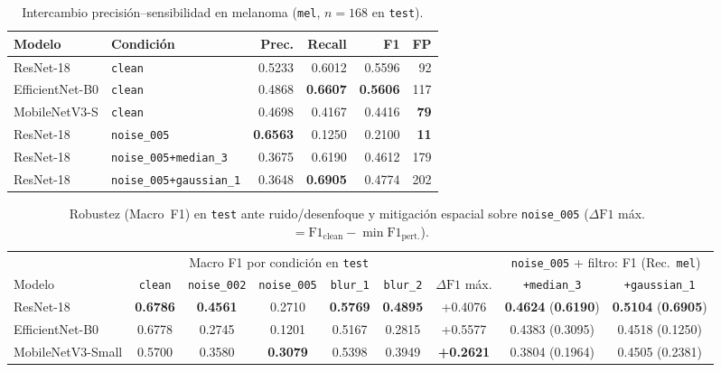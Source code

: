 \documentclass[conference]{IEEEtran}
\begin{document}
\begin{table}[t]
\centering\scriptsize
\setlength{\tabcolsep}{3.4pt}
\caption{Intercambio precisi\'on--sensibilidad en melanoma (\texttt{mel}, $n=168$ en \texttt{test}).}
\label{tab:mel_tradeoff}
\begin{tabular}{llrrrr}\toprule
Modelo & Condici\'on & Prec. & Recall & F1 & FP \\ \midrule
ResNet-18 & \texttt{clean} & 0.5233 & 0.6012 & 0.5596 & 92 \\
EfficientNet-B0 & \texttt{clean} & 0.4868 & \textbf{0.6607} & \textbf{0.5606} & 117 \\
MobileNetV3-S & \texttt{clean} & 0.4698 & 0.4167 & 0.4416 & \textbf{79} \\ \midrule
ResNet-18 & \texttt{noise\_005} & \textbf{0.6563} & 0.1250 & 0.2100 & \textbf{11} \\
ResNet-18 & \texttt{noise\_005+median\_3} & 0.3675 & 0.6190 & 0.4612 & 179 \\
ResNet-18 & \texttt{noise\_005+gaussian\_1} & 0.3648 & \textbf{0.6905} & 0.4774 & 202 \\
\bottomrule\end{tabular}
\end{table}

\begin{table}[t]
\centering\scriptsize
\setlength{\tabcolsep}{4pt}
\caption{Robustez (Macro~F1) en \texttt{test} ante ruido/desenfoque y mitigaci\'on espacial sobre \texttt{noise\_005} ($\Delta\mathrm{F1}$ m\'ax.\ $= \mathrm{F1}_{\mathrm{clean}}-\min\mathrm{F1}_{\mathrm{pert.}}$).}
\label{tab:rob}
\begin{tabular}{lcccccccc}\toprule
& \multicolumn{5}{c}{Macro F1 por condici\'on en \texttt{test}} & & \multicolumn{2}{c}{\texttt{noise\_005} + filtro: F1 (Rec.\ \texttt{mel})} \\
\cmidrule(lr){2-6}\cmidrule(lr){8-9}
Modelo & \texttt{clean} & \texttt{noise\_002} & \texttt{noise\_005} & \texttt{blur\_1} & \texttt{blur\_2} & $\Delta\mathrm{F1}$ m\'ax. & \texttt{+median\_3} & \texttt{+gaussian\_1} \\ \midrule
ResNet-18 & \textbf{0.6786} & \textbf{0.4561} & 0.2710 & \textbf{0.5769} & \textbf{0.4895} & +0.4076 & \textbf{0.4624} (\textbf{0.6190}) & \textbf{0.5104} (\textbf{0.6905}) \\
EfficientNet-B0 & 0.6778 & 0.2745 & 0.1201 & 0.5167 & 0.2815 & +0.5577 & 0.4383 (0.3095) & 0.4518 (0.1250) \\
MobileNetV3-Small & 0.5700 & 0.3580 & \textbf{0.3079} & 0.5398 & 0.3949 & \textbf{+0.2621} & 0.3804 (0.1964) & 0.4505 (0.2381) \\
\bottomrule\end{tabular}
\end{table}
\end{document}
